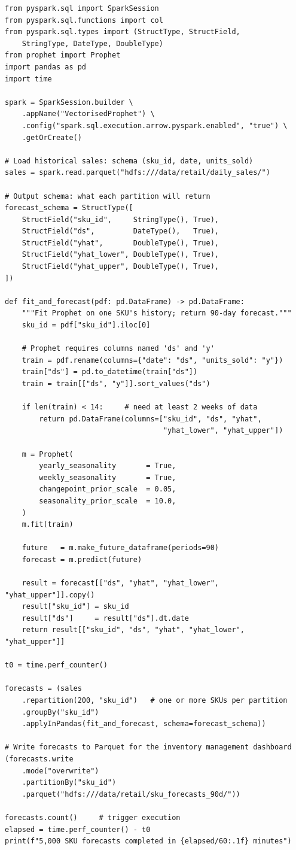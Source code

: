 \begin{lstlisting}[style=pyspark, caption={Vectorised Prophet forecasting:
  5\,000 SKUs in parallel with applyInPandas}]
from pyspark.sql import SparkSession
from pyspark.sql.functions import col
from pyspark.sql.types import (StructType, StructField,
    StringType, DateType, DoubleType)
from prophet import Prophet
import pandas as pd
import time

spark = SparkSession.builder \
    .appName("VectorisedProphet") \
    .config("spark.sql.execution.arrow.pyspark.enabled", "true") \
    .getOrCreate()

# Load historical sales: schema (sku_id, date, units_sold)
sales = spark.read.parquet("hdfs:///data/retail/daily_sales/")

# Output schema: what each partition will return
forecast_schema = StructType([
    StructField("sku_id",     StringType(), True),
    StructField("ds",         DateType(),   True),
    StructField("yhat",       DoubleType(), True),
    StructField("yhat_lower", DoubleType(), True),
    StructField("yhat_upper", DoubleType(), True),
])

def fit_and_forecast(pdf: pd.DataFrame) -> pd.DataFrame:
    """Fit Prophet on one SKU's history; return 90-day forecast."""
    sku_id = pdf["sku_id"].iloc[0]

    # Prophet requires columns named 'ds' and 'y'
    train = pdf.rename(columns={"date": "ds", "units_sold": "y"})
    train["ds"] = pd.to_datetime(train["ds"])
    train = train[["ds", "y"]].sort_values("ds")

    if len(train) < 14:     # need at least 2 weeks of data
        return pd.DataFrame(columns=["sku_id", "ds", "yhat",
                                     "yhat_lower", "yhat_upper"])

    m = Prophet(
        yearly_seasonality       = True,
        weekly_seasonality       = True,
        changepoint_prior_scale  = 0.05,
        seasonality_prior_scale  = 10.0,
    )
    m.fit(train)

    future   = m.make_future_dataframe(periods=90)
    forecast = m.predict(future)

    result = forecast[["ds", "yhat", "yhat_lower", "yhat_upper"]].copy()
    result["sku_id"] = sku_id
    result["ds"]     = result["ds"].dt.date
    return result[["sku_id", "ds", "yhat", "yhat_lower", "yhat_upper"]]

t0 = time.perf_counter()

forecasts = (sales
    .repartition(200, "sku_id")   # one or more SKUs per partition
    .groupBy("sku_id")
    .applyInPandas(fit_and_forecast, schema=forecast_schema))

# Write forecasts to Parquet for the inventory management dashboard
(forecasts.write
    .mode("overwrite")
    .partitionBy("sku_id")
    .parquet("hdfs:///data/retail/sku_forecasts_90d/"))

forecasts.count()     # trigger execution
elapsed = time.perf_counter() - t0
print(f"5,000 SKU forecasts completed in {elapsed/60:.1f} minutes")
\end{lstlisting}

